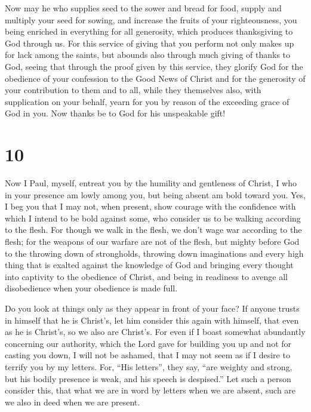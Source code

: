  Now may he who supplies seed to the sower and bread for
food, supply and multiply your seed for sowing, and increase the fruits
of your righteousness,  you being enriched in everything
for all generosity, which produces thanksgiving to God through us.
 For this service of giving that you perform not only
makes up for lack among the saints, but abounds also through much giving
of thanks to God,  seeing that through the proof given by
this service, they glorify God for the obedience of your confession to
the Good News of Christ and for the generosity of your contribution to
them and to all,  while they themselves also, with
supplication on your behalf, yearn for you by reason of the exceeding
grace of God in you.  Now thanks be to God for his
unspeakable gift!

\hypertarget{section-9}{%
\section{10}\label{section-9}}

 Now I Paul, myself, entreat you by the humility and
gentleness of Christ, I who in your presence am lowly among you, but
being absent am bold toward you.  Yes, I beg you that I
may not, when present, show courage with the confidence with which I
intend to be bold against some, who consider us to be walking according
to the flesh.  For though we walk in the flesh, we don't
wage war according to the flesh;  for the weapons of our
warfare are not of the flesh, but mighty before God to the throwing down
of strongholds,  throwing down imaginations and every high
thing that is exalted against the knowledge of God and bringing every
thought into captivity to the obedience of Christ,  and
being in readiness to avenge all disobedience when your obedience is
made full.

 Do you look at things only as they appear in front of
your face? If anyone trusts in himself that he is Christ's, let him
consider this again with himself, that even as he is Christ's, so we
also are Christ's.  For even if I boast somewhat
abundantly concerning our authority, which the Lord gave for building
you up and not for casting you down, I will not be ashamed,
 that I may not seem as if I desire to terrify you by my
letters.  For, ``His letters'', they say, ``are weighty
and strong, but his bodily presence is weak, and his speech is
despised.''  Let such a person consider this, that what
we are in word by letters when we are absent, such are we also in deed
when we are present.

